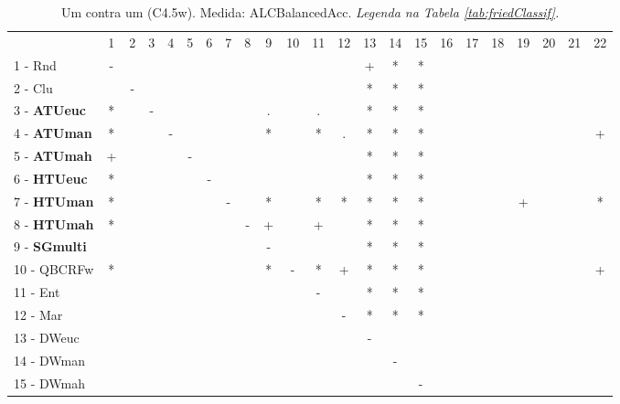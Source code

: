 \begin{table}[h]
\caption{Um contra um (C4.5w). Medida: ALCBalancedAcc. \textit{Legenda na Tabela \ref{tab:friedClassif}.}}
\begin{center}\begin{tabular}{lcc|cc|cc|cc|cc|cc|cc|cc|cc|cc|cc}
 			& 1 & 2 & 3 & 4 & 5 & 6 & 7 & 8 & 9 & 10 & 11 & 12 & 13 & 14 & 15 & 16 & 17 & 18 & 19 & 20 & 21 & 22\\
1 - Rnd  	& - &   &   &   &   &   &   &   &   &   &   &   & + & * & * &   &   &   &   &   &   &   \\
2 - Clu  	&   & - &   &   &   &   &   &   &   &   &   &   & * & * & * &   &   &   &   &   &   &   \\ \hline
3 - \textbf{ATUeuc}	& * &   & - &   &   &   &   &   & . &   & . &   & * & * & * &   &   &   &   &   &   &   \\
4 - \textbf{ATUman}	& * &   &   & - &   &   &   &   & * &   & * & . & * & * & * &   &   &   &   &   &   & + \\ \hline
5 - \textbf{ATUmah}	& + &   &   &   & - &   &   &   &   &   &   &   & * & * & * &   &   &   &   &   &   &   \\
6 - \textbf{HTUeuc}	& * &   &   &   &   & - &   &   &   &   &   &   & * & * & * &   &   &   &   &   &   &   \\ \hline
7 - \textbf{HTUman}	& * &   &   &   &   &   & - &   & * &   & * & * & * & * & * &   &   &   & + &   &   & * \\
8 - \textbf{HTUmah}	& * &   &   &   &   &   &   & - & + &   & + &   & * & * & * &   &   &   &   &   &   &   \\ \hline
9 - \textbf{SGmulti}	&   &   &   &   &   &   &   &   & - &   &   &   & * & * & * &   &   &   &   &   &   &   \\
10 - QBCRFw	& * &   &   &   &   &   &   &   & * & - & * & + & * & * & * &   &   &   &   &   &   & + \\ \hline
11 - Ent  	&   &   &   &   &   &   &   &   &   &   & - &   & * & * & * &   &   &   &   &   &   &   \\
12 - Mar  	&   &   &   &   &   &   &   &   &   &   &   & - & * & * & * &   &   &   &   &   &   &   \\ \hline
13 - DWeuc	&   &   &   &   &   &   &   &   &   &   &   &   & - &   &   &   &   &   &   &   &   &   \\
14 - DWman	&   &   &   &   &   &   &   &   &   &   &   &   &   & - &   &   &   &   &   &   &   &   \\ \hline
15 - DWmah	&   &   &   &   &   &   &   &   &   &   &   &   &   &   & - &   &   &   &   &   &   &   \\

\end{tabular}
\end{center}
\end{table}
